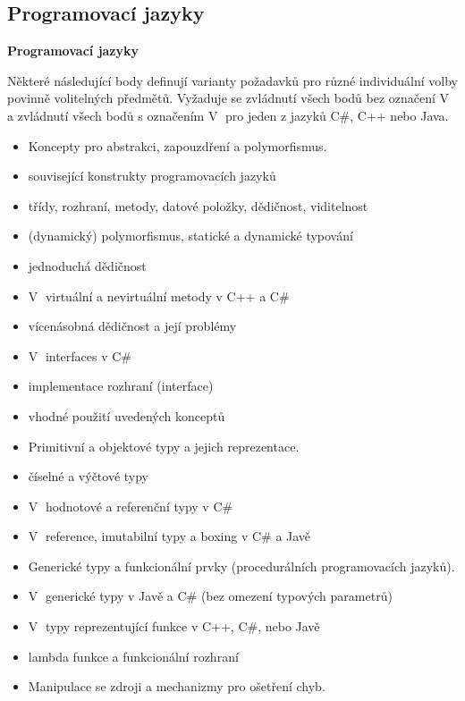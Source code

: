 \subsection{Programovací jazyky}

\begin{tema}
\textbf{Programovací jazyky}

Některé následující body definují varianty požadavků pro různé individuální volby povinně volitelných předmětů.
Vyžaduje se zvládnutí všech bodů bez označení \textcircled{V} a zvládnutí všech bodů s označením \textcircled{V} pro jeden z jazyků C\#, C++ nebo Java.
\begin{itemize}[leftmargin=1.2em,itemsep=0pt,topsep=1pt]
  \item Koncepty pro abstrakci, zapouzdření a polymorfismus.
  \item související konstrukty programovacích jazyků
  \item třídy, rozhraní, metody, datové položky, dědičnost, viditelnost
  \item (dynamický) polymorfismus, statické a dynamické typování
  \item jednoduchá dědičnost
  \item \textcircled{V} virtuální a nevirtuální metody v C++ a C\#
  \item vícenásobná dědičnost a její problémy
  \item \textcircled{V} interfaces v C\#
  \item implementace rozhraní (interface)
  \item vhodné použití uvedených konceptů
  \item Primitivní a objektové typy a jejich reprezentace.
  \item číselné a výčtové typy
  \item \textcircled{V} hodnotové a referenční typy v C\#
  \item \textcircled{V} reference, imutabilní typy a boxing v C\# a Javě
  \item Generické typy a funkcionální prvky (procedurálních programovacích jazyků).
  \item \textcircled{V} generické typy v Javě a C\# (bez omezení typových parametrů)
  \item \textcircled{V} typy reprezentující funkce v C++, C\#, nebo Javě
  \item lambda funkce a funkcionální rozhraní
  \item Manipulace se zdroji a mechanizmy pro ošetření chyb.

\end{itemize}
\end{tema}

